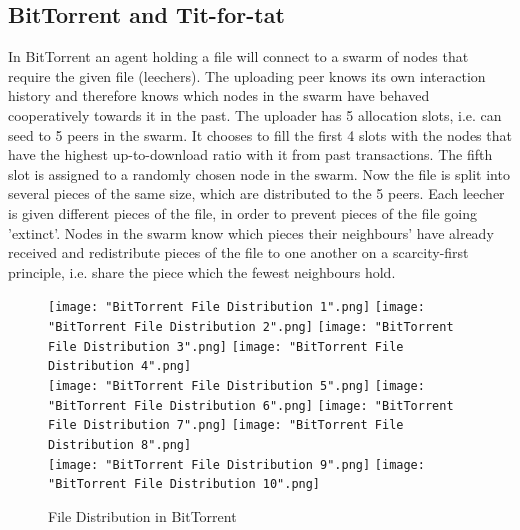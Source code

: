 \documentclass[11pt,a4paper]{report}
\theoremstyle{definition}
\theoremstyle{theorem}
\theoremstyle{proposition}
\theoremstyle{corollary}
\theoremstyle{lemma}
\theoremstyle{example}
\theoremstyle{remark}
\begin{document}
\subsection{BitTorrent and Tit-for-tat}
\label{subsec:BitTorrent and Tit-for-tat}
In BitTorrent an agent holding a file will connect to a swarm of nodes that require the given file (leechers). The uploading peer knows its own interaction history and therefore knows which nodes in the swarm have behaved cooperatively towards it in the past. The uploader has 5 allocation slots, i.e. can seed to 5 peers in the swarm. It chooses to fill the first 4 slots with the nodes that have the highest up-to-download ratio with it from past transactions. The fifth slot is assigned to a randomly chosen node in the swarm. Now the file is split into several pieces of the same size, which are distributed to the 5 peers. Each leecher is given different pieces of the file, in order to prevent pieces of the file going 'extinct'. Nodes in the swarm know which pieces their neighbours' have already received and redistribute pieces of the file to one another on a scarcity-first principle, i.e. share the piece which the fewest neighbours hold. \vspace{1em}\\

\begin{figure}%
\texttt{[image: "BitTorrent File Distribution 1".png]} \hspace{1em}
\texttt{[image: "BitTorrent File Distribution 2".png]} \hspace{1em}
\texttt{[image: "BitTorrent File Distribution 3".png]} \hspace{1em}
\texttt{[image: "BitTorrent File Distribution 4".png]} \vspace{2em} \\ %
\texttt{[image: "BitTorrent File Distribution 5".png]} \hspace{1em}
\texttt{[image: "BitTorrent File Distribution 6".png]} \hspace{1em}
\texttt{[image: "BitTorrent File Distribution 7".png]} \hspace{1em}
\texttt{[image: "BitTorrent File Distribution 8".png]} \vspace{2em} \\ %
\texttt{[image: "BitTorrent File Distribution 9".png]} \hspace{1em}
\texttt{[image: "BitTorrent File Distribution 10".png]}
\caption{File Distribution in BitTorrent}
\label{fig:File Distribution in BitTorrent}
\end{figure}
\end{document}
